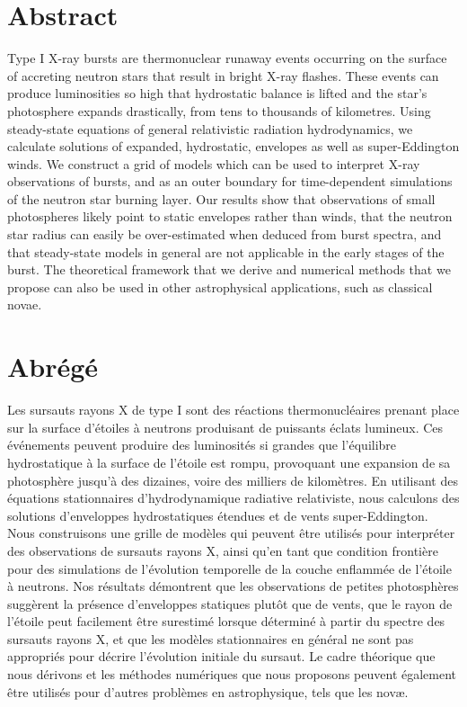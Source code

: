 \documentclass[../main.tex]{subfiles}
\begin{document}
\thispagestyle{empty}
\chapter*{Abstract}
Type I X-ray bursts are thermonuclear runaway events occurring on the surface of accreting neutron stars that result in bright X-ray flashes. These events can produce luminosities so high that hydrostatic balance is lifted and the star's photosphere expands drastically, from tens to thousands of kilometres. Using steady-state equations of general relativistic radiation hydrodynamics, we calculate solutions of expanded, hydrostatic, envelopes as well as super-Eddington winds. We construct a grid of models which can be used to interpret X-ray observations of bursts, and as an outer boundary for time-dependent simulations of the neutron star burning layer. Our results show that observations of small photospheres likely point to static envelopes rather than winds, that the neutron star radius can easily be over-estimated when deduced from burst spectra, and that steady-state models in general are not applicable in the early stages of the burst. The theoretical framework that we derive and numerical methods that we propose can also be used in other astrophysical applications, such as classical novae.

\chapter*{Abrégé}
Les sursauts rayons X de type I sont des réactions thermonucléaires prenant place sur la surface d'étoiles à neutrons produisant de puissants éclats lumineux. Ces événements peuvent produire des luminosités si grandes que l'équilibre hydrostatique à la surface de l'étoile est rompu, provoquant une expansion de sa photosphère jusqu'à des dizaines, voire des milliers de kilomètres. En utilisant des équations stationnaires d'hydrodynamique radiative relativiste, nous calculons des solutions d'enveloppes hydrostatiques étendues et de vents super-Eddington. Nous construisons une grille de modèles qui peuvent être utilisés pour interpréter des observations de sursauts rayons X, ainsi qu'en tant que condition frontière pour des simulations de l'évolution temporelle de la couche enflammée de l'étoile à neutrons. Nos résultats démontrent que les observations de petites photosphères suggèrent la présence d'enveloppes statiques plutôt que de vents, que le rayon de l'étoile peut facilement être surestimé lorsque déterminé à partir du spectre des sursauts rayons X, et que les modèles stationnaires en général ne sont pas appropriés pour décrire l'évolution initiale du sursaut. Le cadre théorique que nous dérivons et les méthodes numériques que nous proposons peuvent également être utilisés pour d'autres problèmes en astrophysique, tels que les nov{\ae}.

\end{document}

